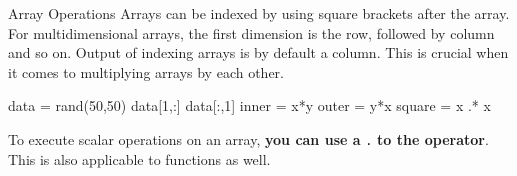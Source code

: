 \documentclass{beamer}
\newenvironment{Boxx}{\begin{tcolorbox}[standard jigsaw, opacityframe=0.8, opacityback=0.0,left=2pt,right=2pt,top=0pt,bottom=0pt]}{\end{tcolorbox}}
\begin{document}
\begin{frame}[fragile]{Array Operations}
	Arrays can be indexed by using square brackets after the array. For multidimensional arrays, the first dimension is the row, followed by column and so on. Output of indexing arrays is by default a column. This is crucial when it comes to multiplying arrays by each other.
	
\pause	
  \begin{Boxx}
  \begin{jllisting}
		data = rand(50,50)
		data[1,:]
		data[:,1]
		inner = x*y
		outer = y*x
		square = x .* x
	\end{jllisting}
  \end{Boxx}

	
	To execute scalar operations on an array, \textbf{you can use a} \verb|.| \textbf{to the operator}. This is also applicable to functions as well.
		
	\pause
	\vspace*{0.5cm}
	\pause
	
\end{frame}
\end{document}
